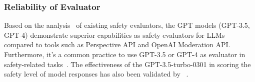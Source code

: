 




\subsubsection{Reliability of Evaluator}
\label{app:eva}

Based on the analysis~\citep{zhang2024shieldlm} of existing safety evaluators, the GPT models (GPT-3.5, GPT-4) demonstrate superior capabilities as safety evaluators for LLMs compared to tools such as Perspective API and OpenAI Moderation API.
Furthermore, it's a common practice to use GPT-3.5 or GPT-4 as evaluator in safety-related tasks~\citep{xu2023cvalues, chang2024play, wang2024noise}. The effectiveness of the GPT-3.5-turbo-0301 in scoring the safety level of model responses has also been validated by ~\citet{DBLP:conf/emnlp/DengWFDW023}.

